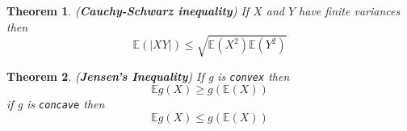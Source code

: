 \documentclass[12pt, letterpaper, twoside]{article}
\newtheorem{theorem}{Theorem}
\begin{document}
\begin{theorem}(\textbf{Cauchy-Schwarz inequality})
If $X$ and $Y$ have finite variances then
\[\mathbb{E}(|XY|) \leq \sqrt{\mathbb{E}(X^2)\mathbb{E}(Y^2)}\]
\end{theorem}

\begin{theorem}(\textbf{Jensen's Inequality})
If g is \texttt{convex} then
\[\mathbb{E}g(X) \geq g(\mathbb{E}(X))\]
if g is \texttt{concave} then 
\[\mathbb{E}g(X) \leq g(\mathbb{E}(X))\]
\end{theorem}
\end{document}
